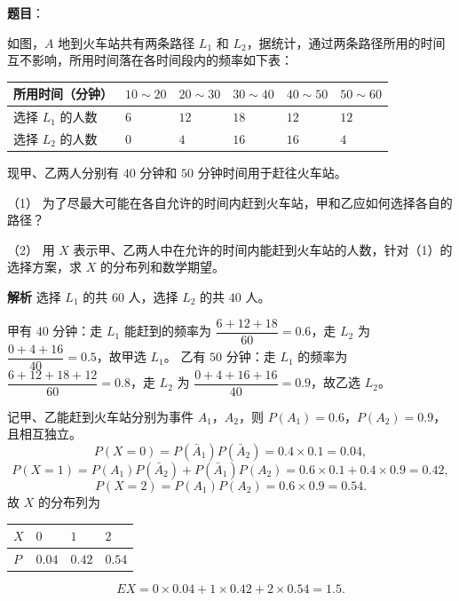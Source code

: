 \begin{answer}

\textbf{题目}：

如图，$A$ 地到火车站共有两条路径 $L_1$ 和 $L_2$，据统计，通过两条路径所用的时间互不影响，所用时间落在各时间段内的频率如下表：

\begin{center}
\begin{tabular}{llllll}
\toprule
所用时间（分钟） & $10\sim20$ & $20\sim30$ & $30\sim40$ & $40\sim50$ & $50\sim60$ \\
\midrule
选择 $L_1$ 的人数 & $6$ & $12$ & $18$ & $12$ & $12$ \\
选择 $L_2$ 的人数 & $0$ & $4$ & $16$ & $16$ & $4$ \\
\bottomrule
\end{tabular}
\end{center}

现甲、乙两人分别有 $40$ 分钟和 $50$ 分钟时间用于赶往火车站。

（1） 为了尽最大可能在各自允许的时间内赶到火车站，甲和乙应如何选择各自的路径？

（2） 用 $X$ 表示甲、乙两人中在允许的时间内能赶到火车站的人数，针对（1）的选择方案，求 $X$ 的分布列和数学期望。
\nopagebreak[4]
\begin{center}\end{center}
\nopagebreak[4]
\textbf{解析}
选择 $L_1$ 的共 $60$ 人，选择 $L_2$ 的共 $40$ 人。

甲有 $40$ 分钟：走 $L_1$ 能赶到的频率为 $\dfrac{6+12+18}{60}=0.6$，走 $L_2$ 为 $\dfrac{0+4+16}{40}=0.5$，故甲选 $L_1$。
乙有 $50$ 分钟：走 $L_1$ 的频率为 $\dfrac{6+12+18+12}{60}=0.8$，走 $L_2$ 为 $\dfrac{0+4+16+16}{40}=0.9$，故乙选 $L_2$。

记甲、乙能赶到火车站分别为事件 $A_1$，$A_2$，则 $P(A_1)=0.6$，$P(A_2)=0.9$，且相互独立。
\nopagebreak[4]
\[P(X=0)=P(\bar A_1)P(\bar A_2)=0.4\times0.1=0.04,\]
\nopagebreak[4]
\[P(X=1)=P(A_1)P(\bar A_2)+P(\bar A_1)P(A_2)=0.6\times0.1+0.4\times0.9=0.42,\]
\nopagebreak[4]
\[P(X=2)=P(A_1)P(A_2)=0.6\times0.9=0.54.\]
故 $X$ 的分布列为

\begin{center}
\begin{tabular}{llll}
\toprule
$X$ & $0$ & $1$ & $2$ \\
\midrule
$P$ & $0.04$ & $0.42$ & $0.54$ \\
\bottomrule
\end{tabular}
\end{center}

\nopagebreak[4]
\[EX=0\times0.04+1\times0.42+2\times0.54=1.5.\]



\end{answer}
